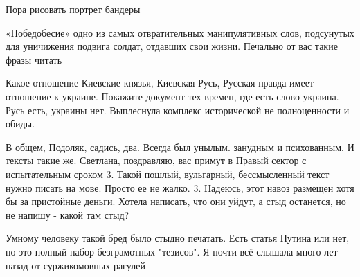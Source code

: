 \begin{itemize}
Пора рисовать портрет бандеры


 

«Победобесие» одно из самых отвратительных манипулятивных слов, подсунутых для
уничижения подвига солдат, отдавших свои жизни. Печально от вас такие фразы
читать

 

Какое отношение Киевские князья, Киевская Русь, Русская правда имеет отношение
к украине. Покажите документ тех времен, где есть слово украина. Русь есть,
украины нет. Выплеснула комплекс исторической не полноценности и обиды.


 

В общем, Подоляк, садись, два. Всегда был унылым. занудным и психованным. И
тексты такие же. Светлана, поздравляю, вас примут в Правый сектор с
испытательным сроком 3. Такой пошлый, вульгарный, бессмысленный текст нужно
писать на мове. Просто ее не жалко. 3. Надеюсь, этот навоз размещен хотя бы за
пристойные деньги. Хотела написать, что они уйдут, а стыд останется, но не
напишу - какой там стыд?


 

Умному человеку такой бред было стыдно печатать. Есть статья Путина или нет, но
это полный набор безграмотных "тезисов". Я почти всё слышала много лет назад от
суржикомовных рагулей

 

\end{itemize}

